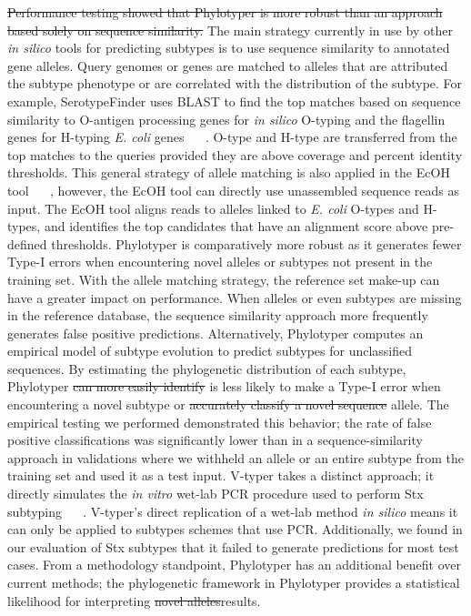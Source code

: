 \documentclass{bioinfo}
\providecommand{\DIFadd}[1]{{\protect\color{red}#1}} %
\providecommand{\DIFdel}[1]{{\protect\color{red}\sout{#1}}}                      %
\providecommand{\DIFaddbegin}{} %
\providecommand{\DIFaddend}{} %
\providecommand{\DIFdelbegin}{} %
\providecommand{\DIFdelend}{} %
\begin{document}
\DIFdelbegin \DIFdel{Performance testing showed that Phylotyper is more robust than an approach based solely on sequence similarity.
}\DIFdelend \DIFaddbegin \DIFadd{The main strategy currently in use by other }\textit{\DIFadd{in silico}} \DIFadd{tools for predicting subtypes is to use sequence similarity to annotated gene alleles.
Query genomes or genes are matched to alleles that are attributed the subtype phenotype or are correlated with the distribution of the subtype.
For example, SerotypeFinder uses BLAST to find the top matches based on sequence similarity to O-antigen processing genes for }\textit{\DIFadd{in silico}} \DIFadd{O-typing and the flagellin genes for H-typing }\textit{\DIFadd{E. coli}} \DIFadd{genes \mbox{%
\citep{Jenkins2015}
}%
.  
O-type and H-type are transferred from the top matches to the queries provided they are above coverage and percent identity thresholds.
This general strategy of allele matching is also applied in the EcOH tool \mbox{%
\citep{Ingle2016}
}%
, however, the EcOH tool can directly use unassembled sequence reads as input. The EcOH tool aligns reads to alleles linked to }\textit{\DIFadd{E. coli}} \DIFadd{O-types and H-types, and identifies the top candidates that have an alignment score above pre-defined thresholds.
Phylotyper is comparatively more robust as it generates fewer Type-I errors when encountering novel alleles or subtypes not present in the training set.
With the allele matching strategy, the reference set make-up can have a greater impact on performance.
When alleles or even subtypes are missing in the reference database, the sequence similarity approach more frequently generates false positive predictions.
Alternatively, }\DIFaddend Phylotyper computes an empirical model of subtype evolution to predict subtypes for unclassified sequences.
By estimating the phylogenetic distribution of each subtype, Phylotyper \DIFdelbegin \DIFdel{can more easily identify }\DIFdelend \DIFaddbegin \DIFadd{is less likely to make a Type-I error when encountering }\DIFaddend a novel subtype or \DIFdelbegin \DIFdel{accurately classify a novel sequence }\DIFdelend allele. 
The \DIFaddbegin \DIFadd{empirical testing we performed demonstrated this behavior; 
the rate of false positive classifications was significantly lower than in a sequence-similarity approach in validations where we withheld an allele or an entire subtype from the training set and used it as a test input.
V-typer takes a distinct approach; it directly simulates the }\textit{\DIFadd{in vitro}} \DIFadd{wet-lab PCR procedure used to perform Stx subtyping \mbox{%
\citep{CARRILLO2016}
}%
. 
V-typer's direct replication of a wet-lab method }\textit{\DIFadd{in silico}} \DIFadd{means it can only be applied to subtypes schemes that use PCR. 
Additionally, we found in our evaluation of Stx subtypes that it failed to generate predictions for most test cases.
From a methodology standpoint, Phylotyper has an additional benefit over current methods; the }\DIFaddend phylogenetic framework in Phylotyper provides a statistical likelihood for interpreting \DIFdelbegin \DIFdel{novel alleles}\DIFdelend \DIFaddbegin \DIFadd{results}\DIFaddend .
\end{document}
